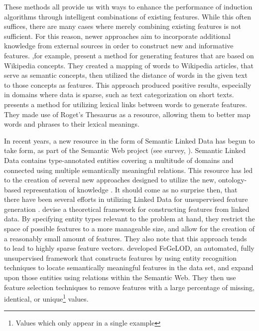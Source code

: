 \documentclass[twoside,11pt]{article}
\theoremstyle{definition}
\begin{document}
These methods all provide us with ways to enhance the performance of induction algorithms through intelligent combinations of existing features. While this often suffices, there are many cases where merely combining existing features is not sufficient. For this reason, newer approaches aim to incorporate additional knowledge from external sources in order to construct new and informative features.
 ,for example, present a method for generating features that are based on Wikipedia concepts. They created a mapping of words to Wikipedia articles, that serve as semantic concepts, then utilized the distance of words in the given text to those concepts as features. This approach produced positive results, especially in domains where data is sparse, such as text categorization on short texts.
 presents a method for utilizing lexical links between words to generate features. They made use of Roget's Thesaurus as a resource, allowing them to better map words and phrases to their lexical meanings.

In recent years, a new resource in the form of Semantic Linked Data has begun to take form, as part of the Semantic Web project (see survey, ). Semantic Linked Data contains type-annotated entities covering a multitude of domains and connected using multiple semantically meaningful relations.
This resource has led to the creation of several new approaches designed to utilize the new, ontology-based representation of knowledge \cite{losch2012graph,rios2014statistical}.
It should come as no surprise then, that there have been several efforts in utilizing Linked Data for unsupervised feature generation \cite{cheng2011automatedfull,paulheim2012unsupervisedfull}.  devise a theoretical framework for constructing features from linked data. By specifying entity types relevant to the problem at hand, they restrict the space of possible features to a more manageable size, and allow for the creation of a reasonably small amount of features. They also note that this approach tends to lead to highly sparse feature vectors.
 developed FeGeLOD, an automated, fully unsupervised framework that constructs features by using entity recognition techniques to locate semantically meaningful features in the data set, and expand upon those entities using relations within the Semantic Web. They then use feature selection techniques to remove features with a large percentage of missing, identical, or unique\footnote{Values which only appear in a single example} values. 
\end{document}
